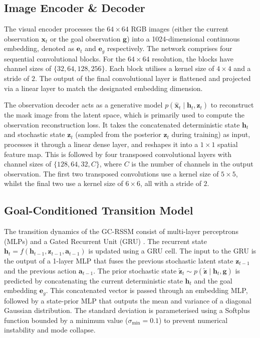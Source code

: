 \documentclass[journal]{IEEEtran}
\begin{document}
\subsection{Image Encoder \& Decoder} The visual encoder processes the $64 \times 64$ RGB images (either the current observation $\bm{x}_t$ or the goal observation $\bm{g}$) into a 1024-dimensional continuous embedding, denoted as $\bm{e}_t$ and $\bm{e}_g$ respectively. The network comprises four sequential convolutional blocks. For the $64 \times 64$ resolution, the blocks have channel sizes of $\{32, 64, 128, 256\}$. Each block utilises a kernel size of $4 \times 4$ and a stride of $2$. The output of the final convolutional layer is flattened and projected via a linear layer to match the designated embedding dimension.

The observation decoder acts as a generative model $p(\hat{\bm{x}}_t \;|\; \bm{h}_t, \bm{z}_t)$ to reconstruct the mask image from the latent space, which is primarily used to compute the observation reconstruction loss. It takes the concatenated deterministic state $\bm{h}_t$ and stochastic state $\bm{z}_t$ (sampled from the posterior $\hat{\bm{z}}_t$ during training) as input, processes it through a linear dense layer, and reshapes it into a $1 \times 1$ spatial feature map. This is followed by four transposed convolutional layers with channel sizes of $\{128, 64, 32, C\}$, where $C$ is the number of channels in the output observation. The first two transposed convolutions use a kernel size of $5 \times 5$, whilst the final two use a kernel size of $6 \times 6$, all with a stride of $2$.

\subsection{Goal-Conditioned Transition Model} The transition dynamics of the GC-RSSM consist of multi-layer perceptrons (MLPs) and a Gated Recurrent Unit (GRU) \cite{cho2014properties}. The recurrent state $\bm{h}_t = f(\bm{h}_{t-1}, \bm{z}_{t-1}, \bm{a}_{t-1})$ is updated using a GRU cell. The input to the GRU is the output of a 1-layer MLP that fuses the previous stochastic latent state $\bm{z}_{t-1}$ and the previous action $\bm{a}_{t-1}$. The prior stochastic state $\tilde{\bm{z}}_t \sim p(\tilde{\bm{z}} \;|\; \bm{h}_t, \bm{g})$ is predicted by concatenating the current deterministic state $\bm{h}_t$ and the goal embedding $\bm{e}_g$. This concatenated vector is passed through an embedding MLP, followed by a state-prior MLP that outputs the mean and variance of a diagonal Gaussian distribution. The standard deviation is parameterised using a Softplus function bounded by a minimum value ($\sigma_{\text{min}} = 0.1$) to prevent numerical instability and mode collapse.
\end{document}
